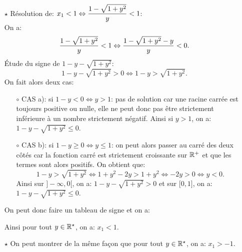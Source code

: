 \documentclass[a4paper, 11pt,reqno]{article}
\begin{document}
\begin{correction}
\begin{enumerate}
\begin{itemize}
			            \begin{itemize}
				            \item[$\star$] R\'esolution de: $x_1<1\Leftrightarrow \displaystyle\frac{1-\sqrt{1+y^2}}{y} <1$:\\
				                  \noindent On a:
				                  $$\displaystyle\frac{1-\sqrt{1+y^2}}{y} <1 \Leftrightarrow \displaystyle\frac{1-\sqrt{1+y^2}-y}{y} <0.$$
				                  \'Etude du signe de $1-y-\sqrt{1+y^2}$:
				                  $$1-y-\sqrt{1+y^2}>0\Leftrightarrow 1-y>\sqrt{1+y^2}.$$
				                  On fait alors deux cas:
				                  \begin{itemize}
					                  \item[$\circ$] CAS a): si $1-y<0\Leftrightarrow y>1$: pas de solution car une racine carr\'ee est toujours positive ou nulle, elle ne peut donc pas \^{e}tre strictement inf\'erieure \`{a} un nombre strictement n\'egatif. Ainsi si $y>1$, on a: $1-y-\sqrt{1+y^2} \leq 0$.
					                  \item[$\circ$] CAS b): si $1-y\geq 0\Leftrightarrow y\leq 1$: on peut alors passer au carr\'e des deux c\^{o}t\'es car la fonction carr\'e est strictement croissante sur $\mathbb{R}^+$ et que les termes sont alors positifs. On obtient que:
					                        $$1-y>\sqrt{1+y^2} \Leftrightarrow 1+y^2-2y>1+y^2\Leftrightarrow -2y>0\Leftrightarrow y<0.$$
					                        Ainsi sur $\rbrack -\infty,0\lbrack$, on a: $1-y-\sqrt{1+y^2}>0$ et sur $\lbrack 0,1\rbrack$, on a: $1-y-\sqrt{1+y^2} \leq 0$.
				                  \end{itemize}
				                  On peut donc faire un tableau de signe et on a:
				                  \begin{center}
				                  \end{center}
				                  Ainsi pour tout $y\in\mathbb{R}^{\star}$, on a: $x_1<1$.
				            \item[$\star$] On peut montrer de la m\^{e}me fa\c{c}on que pour tout $y\in\mathbb{R}^{\star}$, on a: $x_1>-1$.

\end{itemize}
\end{itemize}
\end{enumerate}
\end{correction}
\end{document}
